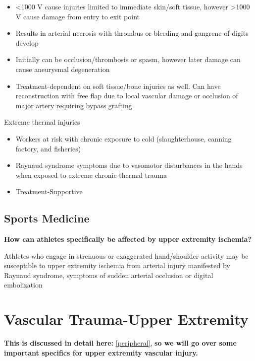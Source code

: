 \documentclass[
]{book}
\begin{document}
\begin{itemize}
\item
  \textless1000 V cause injuries limited to immediate skin/soft tissue,
  however \textgreater1000 V cause damage from entry to exit point
\item
  Results in arterial necrosis with thrombus or bleeding and gangrene
  of digits develop
\item
  Initially can be occlusion/thrombosis or spasm, however later damage
  can cause aneurysmal degeneration
\item
  Treatment-dependent on soft tissue/bone injuries as well. Can have
  reconstruction with free flap due to local vascular damage or
  occlusion of major artery requiring bypass grafting
\end{itemize}

Extreme thermal injuries

\begin{itemize}
\item
  Workers at risk with chronic exposure to cold (slaughterhouse,
  canning factory, and fisheries)
\item
  Raynaud syndrome symptoms due to vasomotor disturbances in the hands
  when exposed to extreme chronic thermal trauma
\item
  Treatment-Supportive
\end{itemize}

\hypertarget{sports-medicine}{%
\subsection{Sports Medicine}\label{sports-medicine}}

\textbf{How can athletes specifically be affected by upper extremity
ischemia?}

Athletes who engage in strenuous or exaggerated hand/shoulder activity
may be susceptible to upper extremity ischemia from arterial injury
manifested by Raynaud syndrome, symptoms of sudden arterial occlusion or
digital embolization

\hypertarget{vascular-trauma-upper-extremity}{%
\section{Vascular Trauma-Upper Extremity}\label{vascular-trauma-upper-extremity}}

\textbf{This is discussed in detail here:} \ref{peripheral}, \textbf{so we will go
over some important specifics for upper extremity vascular injury.}
\citep{kauvar184VascularTrauma2020}
\end{document}
